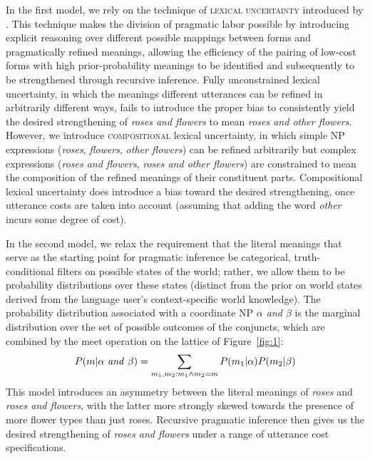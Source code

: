 \documentclass[11pt]{article}
\begin{document}
In the first model, we rely on the technique of \textsc{lexical
  uncertainty} introduced by \citet{bergen-goodman-levy:2012}.  This
technique makes the division of pragmatic labor possible by
introducing explicit reasoning over different possible mappings
between forms and pragmatically refined meanings, allowing the
efficiency of the pairing of low-cost forms with high
prior-probability meanings to be identified and subsequently
to be strengthened through recursive inference.  Fully unconstrained lexical
uncertainty, in which the meanings different utterances can be refined
in arbitrarily different ways, fails to introduce the proper bias to
consistently yield the desired strengthening of \emph{roses and flowers} to
mean \emph{roses and other flowers}.  However, we introduce
\textsc{compositional} lexical uncertainty, in which simple NP
expressions (\emph{roses}, \emph{flowers}, \emph{other flowers}) can
be refined arbitrarily but complex expressions (\emph{roses and
  flowers}, \emph{roses and other flowers}) are constrained to mean
the composition of the refined meanings of their constituent parts.
Compositional lexical uncertainty does introduce a bias toward the
desired strengthening, once utterance costs are taken into account
(assuming that adding the word \emph{other} incurs some degree of
cost). 

In the second model, we relax the requirement that the literal
meanings that serve as the starting point for pragmatic inference be
categorical, truth-conditional filters on possible states of the world; rather, we allow
them to be probability distributions over these states (distinct from
the prior on world states derived from the language user's
context-specific world knowledge).  The probability distribution
associated with a coordinate NP \emph{$\alpha$ and $\beta$} is the
marginal distribution over the set of possible outcomes of the
conjuncts, which are combined by the meet operation on the lattice of
Figure~\ref{fig:1}:
%
    \begin{align*}
      P(m|\alpha\ \text{\emph{and}}\ \beta) = \sum_{m_1,m_2:m_1 \wedge m_2 = m} P(m_1|\alpha) P(m_2|\beta)
    \end{align*}
%
    This model introduces an asymmetry between the literal
    meanings of \emph{roses} and \emph{roses and flowers}, with the
    latter more strongly skewed towards the presence of more flower
    types than just roses. Recursive pragmatic inference then gives us
    the desired strengthening of \emph{roses and flowers} under a
    range of utterance cost specifications.
\end{document}
